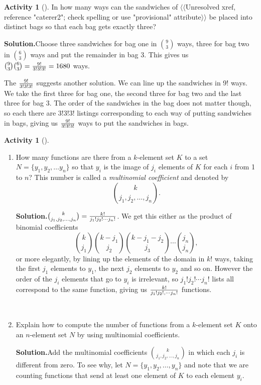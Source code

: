\documentclass[10pt,]{book}
\theoremstyle{plain}
\theoremstyle{definition}
\newtheorem{activity}[project]{Activity}
\numberwithin{equation}{chapter}
\begin{document}
\begin{activity}[]\label{activity-75}
In how many ways can the sandwiches of {$\langle\langle$Unresolved xref, reference "caterer2"; check spelling or use "provisional" attribute$\rangle\rangle$} be placed into distinct bags so that each bag gets exactly three?%
\par\medskip\noindent%
\textbf{Solution.}\quad Choose three sandwiches for bag one in \(9\choose3\) ways, three for bag two in \(6\choose3\) ways and put the remainder in bag 3.  This gives us \({9\choose3}{6\choose3}={9!\over3!3!3!}=1680\) ways.%
\par
The \(9!\over3!3!3!\) suggests another solution. We can line up the sandwiches in 9! ways. We take the first three for bag one, the second three for bag two and the last three for bag 3. The order of the sandwiches in the bag does not matter though, so each there are \(3!3!3!\) listings corresponding to each way of putting sandwiches in bags, giving us \(9!\over3!3!3!\) ways to put the sandwiches in bags.%
\end{activity}
\begin{activity}[]\label{activity-76}
~\par
\begin{enumerate}[label=(\alph*)]
 \item How many functions are there from a \(k\)-element set \(K\) to a set \(N=\{y_1,y_2,\ldots y_n\}\) so that \(y_i\) is the image of \(j_i\) elements of \(K\) for each \(i\) from 1 to \(n\)? This number is called a \emph{multinomial coefficient} and denoted by%
\begin{equation*}
{k\choose
j_1,j_2,\ldots, j_n}.
\end{equation*}
%
\par\medskip\noindent%
\textbf{Solution.}\quad \({k\choose j_1,j_2,\ldots, j_n} =
{k!\over j_1!j_2!\cdots j_n!}\). We get this either as the product of binomial coefficients%
\begin{equation*}
{k\choose j_1}{k-j_1\choose
j_2}{k-j_1-j_2\choose j_3}\cdots{j_n\choose j_n},
\end{equation*}
or more elegantly, by lining up the elements of the domain in \(k!\) ways, taking the first \(j_1\) elements to \(y_1\), the next \(j_2\) elements to \(y_2\) and so on.  However the order of the \(j_i\) elements that go to \(y_i\) is irrelevant, so \(j_1!j_2!\cdots j_n!\) lists all correspond to the same function, giving us \(k!\over j_1!j_2!,\cdots j_n!\) functions.%

~\par
\item Explain how to compute the number of functions from a \(k\)-element set \(K\) onto an \(n\)-element set \(N\) by using multinomial coefficients.%
\par\medskip\noindent%
\textbf{Solution.}\quad Add the multinomial coefficients \(k\choose j_1,j_2,\ldots,j_n\) in which each \(j_i\) is different from zero. To see why, let \(N=\{y_1,y_2,\ldots,y_n\}\) and note that we are counting functions that send at least one element of \(K\) to each element \(y_i\).%

\end{enumerate}
\end{activity}
\end{document}
